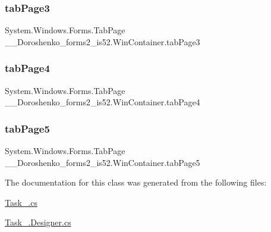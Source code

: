 \subsubsection{\texorpdfstring{tab\+Page3}{tabPage3}}
{\footnotesize\ttfamily System.\+Windows.\+Forms.\+Tab\+Page \+\_\+\_\+\+Doroshenko\+\_\+forms2\+\_\+is52.\+Win\+Container.\+tab\+Page3\hspace{0.3cm}{\ttfamily [private]}}

\hypertarget{class__7___doroshenko__forms2__is52_1_1_win_container_a668bb67ae74294bf8d0c9d693ad407b1}{}\label{class__7___doroshenko__forms2__is52_1_1_win_container_a668bb67ae74294bf8d0c9d693ad407b1} 
\subsubsection{\texorpdfstring{tab\+Page4}{tabPage4}}
{\footnotesize\ttfamily System.\+Windows.\+Forms.\+Tab\+Page \+\_\+\_\+\+Doroshenko\+\_\+forms2\+\_\+is52.\+Win\+Container.\+tab\+Page4\hspace{0.3cm}{\ttfamily [private]}}

\hypertarget{class__7___doroshenko__forms2__is52_1_1_win_container_af352d1f3bdcb743839c129e0fbcb835f}{}\label{class__7___doroshenko__forms2__is52_1_1_win_container_af352d1f3bdcb743839c129e0fbcb835f} 
\subsubsection{\texorpdfstring{tab\+Page5}{tabPage5}}
{\footnotesize\ttfamily System.\+Windows.\+Forms.\+Tab\+Page \+\_\+\_\+\+Doroshenko\+\_\+forms2\+\_\+is52.\+Win\+Container.\+tab\+Page5\hspace{0.3cm}{\ttfamily [private]}}



The documentation for this class was generated from the following files\+:\begin{DoxyCompactItemize}
\item 
\hyperlink{_task__5_8cs}{Task\+\_.\+cs}\item 
\hyperlink{_task__5_8_designer_8cs}{Task\+\_.\+Designer.\+cs}\end{DoxyCompactItemize}
